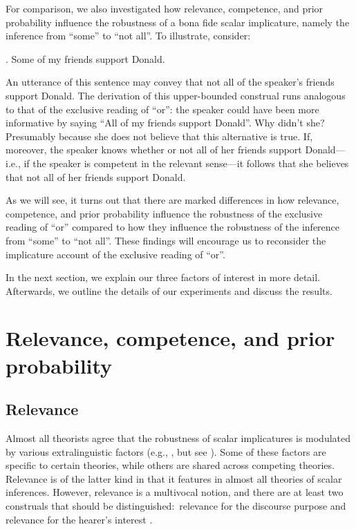 \documentclass[12pt]{article}
\begin{document}
For comparison, we also investigated how relevance, competence, and prior probability influence the robustness of a bona fide scalar implicature, namely the inference from ``some'' to ``not all''. To illustrate, consider:

\ex.	Some of my friends support Donald.

An utterance of this sentence may convey that not all of the speaker's friends support
Donald. The derivation of this upper-bounded construal runs analogous to that of the exclusive
reading of ``or'': the speaker could have been more informative by saying ``All of my friends
support Donald''. Why didn't she? Presumably because she does not believe that this alternative
is true. If, moreover, the speaker knows whether or not all of her friends support Donald---i.e., if the speaker is competent in the relevant sense---it
follows that she believes that not all of her friends support Donald.

As we will see, it turns out that there are marked differences in how relevance, competence, and prior probability influence the robustness of the exclusive reading of ``or'' compared to how they influence the robustness of the inference from ``some'' to ``not all''. These findings will encourage us to reconsider the implicature account of the exclusive reading of ``or''.

In the next section, we explain our three factors of interest in more detail. Afterwards, we outline the details of our experiments and discuss the results.

\section{Relevance, competence, and prior probability}
\subsection*{Relevance}

Almost all theorists agree that the robustness of scalar implicatures is modulated by various extralinguistic factors (e.g., \citealt{chierchia2012, franke2009, geurts2010, horn1972}, but see \citealt{chierchia2004, levinson2000, storto2005}). Some of these factors are specific to certain theories, while others are shared across competing theories. Relevance is of the latter kind in that it features in almost all theories of scalar inferences. However, relevance is a multivocal notion, and there are at least two construals that should be distinguished:\ relevance for the discourse purpose and relevance for the hearer's interest \citep{geurts2010}.
\end{document}

